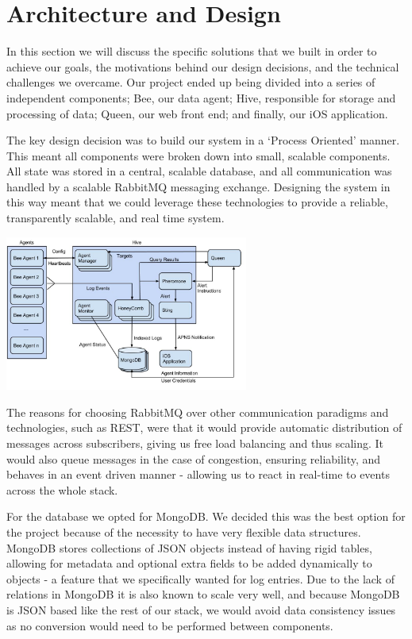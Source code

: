 \section{Architecture and Design}

In this section we will discuss the specific solutions that we built in order to
achieve our goals, the motivations behind our design decisions, and the
technical challenges we overcame. Our project ended up being divided into a
series of independent components; Bee, our data agent; Hive, responsible for
storage and processing of data; Queen, our web front end; and finally, our iOS
application.

The key design decision was to build our system in a ‘Process Oriented’ manner.
This meant all components were broken down into small, scalable components. All
state was stored in a central, scalable database, and all communication was
handled by a scalable RabbitMQ\cite{rabbit} messaging exchange. Designing the system in
this way meant that we could leverage these technologies to provide a reliable,
transparently scalable, and real time system.

\vspace{10 mm}
\graphicspath{{./pics/}}
\includegraphics[width=8cm, keepaspectratio]{design.jpg}
\vspace{10 mm}

The reasons for choosing RabbitMQ over other communication paradigms and
technologies, such as REST, were that it would provide automatic distribution of
messages across subscribers, giving us free load balancing and thus scaling. It
would also queue messages in the case of congestion, ensuring reliability, and
behaves in an event driven manner - allowing us to react in real-time to events
across the whole stack.

For the database we opted for MongoDB\cite{mongo}. We decided this was the best option
for the project because of the necessity to have very flexible data structures.
MongoDB stores collections of JSON objects instead of having rigid tables,
allowing for metadata and optional extra fields to be added dynamically to
objects - a feature that we specifically wanted for log entries. Due to the
lack of relations in MongoDB it is also known to scale very well, and because
MongoDB is JSON based like the rest of our stack, we would avoid data
consistency issues as no conversion would need to be performed between
components.
